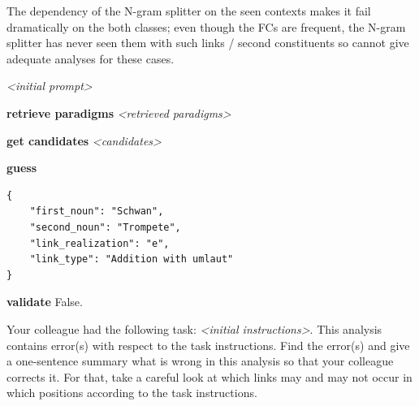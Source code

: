 \documentclass[11pt]{article}
\begin{document}
The dependency of the N-gram splitter on the seen contexts makes it fail dramatically on the both classes; even though the FCs are frequent, the N-gram splitter has never seen them with such links / second constituents so cannot give adequate analyses for these cases.


\begin{center}
    \begin{tcolorbox}[colback=gray!10, colframe=black, width=\linewidth, left=1mm, right=1mm, title=Prediction of \texttt{schwan\_trompete} from \textit{Llama-instruct\textsubscript{+cand+par}}, breakable]
    
        \begin{humanmessage}
            \textit{<initial prompt>}
        \end{humanmessage}

        \begin{toolmessage}{\textbf{retrieve paradigms}}
            \textit{<retrieved paradigms>}
        \end{toolmessage}
        
        \begin{aimessage}{\textbf{get candidates}}
            \textit{<candidates>}
        \end{aimessage}
        
        \begin{aimessage}{\textbf{guess}}
            \begin{verbatim}
{
    "first_noun": "Schwan",
    "second_noun": "Trompete",
    "link_realization": "e",
    "link_type": "Addition with umlaut"
}
            \end{verbatim}
        \end{aimessage}
    
        \begin{toolmessage}{\textbf{validate}}
            False.
        \end{toolmessage}
    
        \begin{humanmessage}
            Your colleague had the following task: \textit{<initial instructions>}.
            This analysis contains error(s) with respect to the task instructions. Find the error(s) and give a one-sentence summary what is wrong in this analysis so that your colleague corrects it. For that, take a careful look at which links may and may not occur in which positions according to the task instructions.
        \end{humanmessage}
    

\end{tcolorbox}
\end{center}
\end{document}
